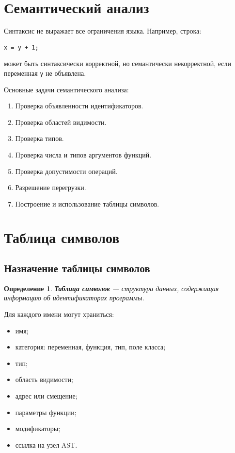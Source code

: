 \documentclass[12pt,a4paper]{article}
\newtheorem{definition}{Определение}
\begin{document}
\section{Семантический анализ}

Синтаксис не выражает все ограничения языка. Например, строка:

\begin{lstlisting}
x = y + 1;
\end{lstlisting}

может быть синтаксически корректной, но семантически некорректной, если переменная \texttt{y} не объявлена.

Основные задачи семантического анализа:

\begin{enumerate}
    \item Проверка объявленности идентификаторов.
    \item Проверка областей видимости.
    \item Проверка типов.
    \item Проверка числа и типов аргументов функций.
    \item Проверка допустимости операций.
    \item Разрешение перегрузки.
    \item Построение и использование таблицы символов.
\end{enumerate}

\section{Таблица символов}

\subsection{Назначение таблицы символов}

\begin{definition}
\textbf{Таблица символов} --- структура данных, содержащая информацию об идентификаторах программы.
\end{definition}

Для каждого имени могут храниться:

\begin{itemize}
    \item имя;
    \item категория: переменная, функция, тип, поле класса;
    \item тип;
    \item область видимости;
    \item адрес или смещение;
    \item параметры функции;
    \item модификаторы;
    \item ссылка на узел AST.
\end{itemize}
\end{document}
